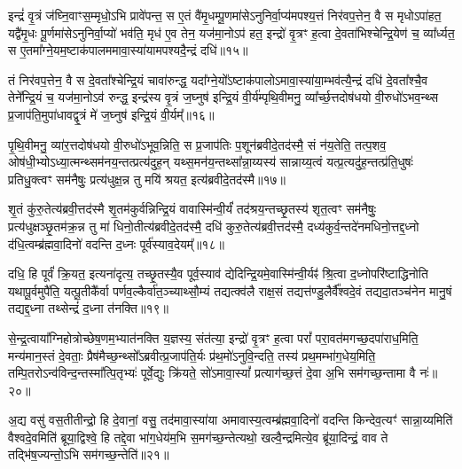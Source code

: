 {\anuvakamend[{अ॒स्य॒ मा वेदा द्यावा॑पृथि॒व्योर॑ब्रवी॒दिति॒ तस्मा᳚च्च॒त्वारि॑ च॥२॥}]}

इन्द्रं॑ वृ॒त्रं ज॑घ्नि॒वाꣳस॒म्मृधो॒\-ऽभि प्रावे॑पन्त॒ स ए॒तं वै॑मृ॒धम्पू॒णमा॑से\-ऽनुनिर्वा॒प्य॑मपश्य॒त्तं निर॑वप॒त्तेन॒ वै स मृधो\-ऽपा॑हत॒ यद्वै॑मृ॒धः पू॒र्णमा॑से\-ऽनुनिर्वा॒प्यो॑ भव॑ति॒ मृध॑ ए॒व तेन॒ यज॑मा॒नो\-ऽप॑ हत॒ इन्द्रो॑ वृ॒त्रꣳ ह॒त्वा दे॒वता॑भिश्चेन्द्रि॒येण॑ च॒ व्या᳚र्ध्यत॒ स ए॒तमा᳚ग्ने॒यम॒ष्टाक॑पालममावा॒स्या॑यामपश्यदै॒न्द्रं दधि॑॥१५॥

तं निर॑वप॒त्तेन॒ वै स दे॒वता᳚श्चेन्द्रि॒यं चावा॑रुन्द्ध॒ यदा᳚ग्ने॒यो᳚\-ऽष्टाक॑पालो\-ऽमावा॒स्या॑या॒म्भव॑त्यै॒न्द्रं दधि॑ दे॒वता᳚श्चै॒व तेने᳚न्द्रि॒यं च॒ यज॑मा॒नो\-ऽव॑ रुन्द्ध॒ इन्द्र॑स्य वृ॒त्रं ज॒घ्नुष॑ इन्द्रि॒यं वी॒र्य॑म्पृथि॒वीमनु॒ व्या᳚र्च्छ॒त्तदोष॑धयो वी॒रुधो॑\-ऽभव॒न्थ्स प्र॒जाप॑ति॒मुपा॑धावद्वृ॒त्रं मे॑ ज॒घ्नुष॑ इन्द्रि॒यं वी॒र्यम्᳚॥१६॥

पृ॒थि॒वीमनु॒ व्या॑र॒त्तदोष॑धयो वी॒रुधो॑\-ऽभूव॒न्निति॒ स प्र॒जाप॑तिः प॒शून॑ब्रवीदे॒तद॑स्मै॒ सं न॑य॒तेति॒ तत्प॒शव॒ ओष॑धी॒भ्यो\-ऽध्या॒त्मन्थ्सम॑नय॒न्तत्प्रत्य॑दुह॒न् यथ्स॒मन॑य॒न्तथ्सा᳚न्ना॒य्यस्य॑ सान्नाय्य॒त्वं यत्प्र॒त्यदु॑ह॒न्तत्प्र॑ति॒धुषः॑ प्रतिधु॒क्त्वꣳ सम॑नैषुः॒ प्रत्य॑धुक्ष॒न्न तु मयि॑ श्रयत॒ इत्य॑ब्रवीदे॒तद॑स्मै॥१७॥

शृ॒तं कु॑रु॒तेत्य॑ब्रवी॒त्तद॑स्मै शृ॒तम॑कुर्वन्निन्द्रि॒यं वावास्मि॑न्वी॒र्यं॑ तद॑श्रय॒न्तच्छृ॒तस्य॑ शृत॒त्वꣳ सम॑नैषुः॒ प्रत्य॑धुक्षञ्छृ॒तम॑क्र॒न्न तु मा॑ धिनो॒तीत्य॑ब्रवीदे॒तद॑स्मै॒ दधि॑ कुरु॒तेत्य॑ब्रवी॒त्तद॑स्मै॒ दध्य॑कुर्व॒न्तदे॑नमधिनो॒त्तद्द॒ध्नो द॑धि॒त्वम्ब्र॑ह्मवा॒दिनो॑ वदन्ति द॒ध्नः पूर्व॑स्याव॒देयम्᳚॥१८॥

दधि॒ हि पूर्वं॑ क्रि॒यत॒ इत्यना॑दृत्य॒ तच्छृ॒तस्यै॒व पूर्व॒स्याव॑ द्येदिन्द्रि॒यमे॒वास्मि॑न्वी॒र्यꣴ॑ श्रि॒त्वा द॒ध्नोपरि॑ष्टाद्धिनोति यथापू॒र्वमुपै॑ति॒ यत्पू॒तीकै᳚र्वा पर्णव॒ल्कैर्वा॑त॒ञ्च्याथ्सौ॒म्यं तद्यत्क्व॑लै राक्ष॒सं तद्यत्त॑ण्डु॒लैर्वै᳚श्वदे॒वं तद्यदा॒तञ्च॑नेन मानु॒षं तद्यद्द॒ध्ना तथ्सेन्द्रं॑ द॒ध्ना त॑नक्ति॥१९॥

से॒न्द्र॒त्वाया᳚ग्निहोत्रोच्छेष॒णम॒भ्यात॑नक्ति य॒ज्ञस्य॒ संत॑त्या॒ इन्द्रो॑ वृ॒त्रꣳ ह॒त्वा परां᳚ परा॒वत॑मगच्छ॒दपा॑राध॒मिति॒ मन्य॑मान॒स्तं दे॒वताः॒ प्रैष॑मैच्छ॒न्थ्सो᳚\-ऽब्रवीत्प्र॒जाप॑ति॒र्यः प्र॑थ॒मो॑\-ऽनुवि॒न्दति॒ तस्य॑ प्रथ॒मम्भा॑ग॒धेय॒मिति॒ तम्पि॒तरो\-ऽन्व॑विन्द॒न्तस्मा᳚त्पि॒तृभ्यः॑ पूर्वे॒द्युः क्रि॑यते॒ सो॑\-ऽमावा॒स्यां᳚ प्रत्याग॑च्छ॒त्तं दे॒वा अ॒भि सम॑गच्छ॒न्तामा वै नः॑॥२०॥

अ॒द्य वसु॑ वस॒तीतीन्द्रो॒ हि दे॒वानां॒ वसु॒ तद॑मावा॒स्या॑या अमावास्य॒त्वम्ब्र॑ह्मवा॒दिनो॑ वदन्ति किन्देव॒त्यꣳ॑ सान्ना॒य्यमिति॑ वैश्वदे॒वमिति॑ ब्रूया॒द्विश्वे॒ हि तद्दे॒वा भा॑ग॒धेय॑म॒भि स॒मग॑च्छ॒न्तेत्यथो॒ खल्वै॒न्द्रमित्ये॒व ब्रू॑या॒दिन्द्रं॒ वाव ते तद्भि॑ष॒ज्यन्तो॒\-ऽभि सम॑गच्छ॒न्तेति॑॥२१॥

